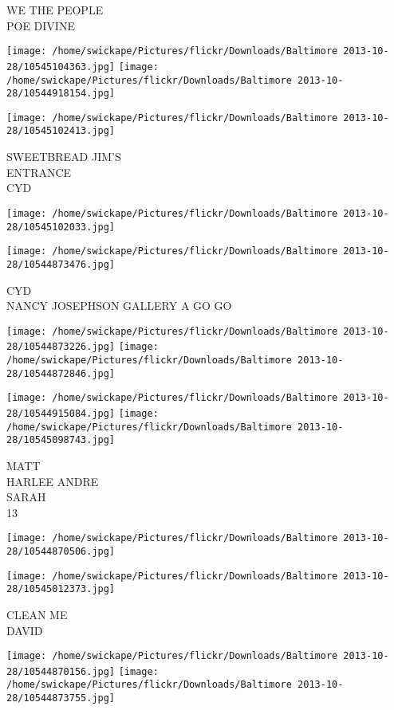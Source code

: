 \documentclass[10pt,letterpaper]{article}
\begin{document}
WE THE PEOPLE\\
POE DIVINE
\pagebreak

\texttt{[image: /home/swickape/Pictures/flickr/Downloads/Baltimore 2013-10-28/10545104363.jpg]}
\texttt{[image: /home/swickape/Pictures/flickr/Downloads/Baltimore 2013-10-28/10544918154.jpg]}

\texttt{[image: /home/swickape/Pictures/flickr/Downloads/Baltimore 2013-10-28/10545102413.jpg]}

SWEETBREAD JIM'S\\
ENTRANCE\\
CYD
\pagebreak

\texttt{[image: /home/swickape/Pictures/flickr/Downloads/Baltimore 2013-10-28/10545102033.jpg]}

\vspace{0.25in}
\texttt{[image: /home/swickape/Pictures/flickr/Downloads/Baltimore 2013-10-28/10544873476.jpg]}

CYD\\
NANCY JOSEPHSON GALLERY A GO GO
\pagebreak

\texttt{[image: /home/swickape/Pictures/flickr/Downloads/Baltimore 2013-10-28/10544873226.jpg]}
\texttt{[image: /home/swickape/Pictures/flickr/Downloads/Baltimore 2013-10-28/10544872846.jpg]}

\texttt{[image: /home/swickape/Pictures/flickr/Downloads/Baltimore 2013-10-28/10544915084.jpg]}
\texttt{[image: /home/swickape/Pictures/flickr/Downloads/Baltimore 2013-10-28/10545098743.jpg]}

MATT\\
HARLEE ANDRE\\
SARAH\\
13
\pagebreak

\texttt{[image: /home/swickape/Pictures/flickr/Downloads/Baltimore 2013-10-28/10544870506.jpg]}

\vspace{0.25in}
\texttt{[image: /home/swickape/Pictures/flickr/Downloads/Baltimore 2013-10-28/10545012373.jpg]}

CLEAN ME\\
DAVID
\pagebreak

\texttt{[image: /home/swickape/Pictures/flickr/Downloads/Baltimore 2013-10-28/10544870156.jpg]}
\texttt{[image: /home/swickape/Pictures/flickr/Downloads/Baltimore 2013-10-28/10544873755.jpg]}
\end{document}
